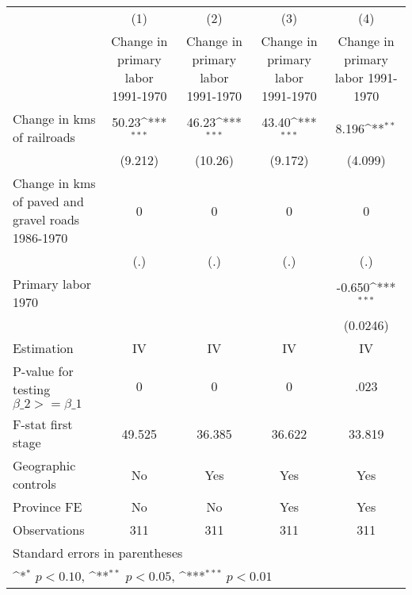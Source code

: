 {
\def\sym#1{\ifmmode^{#1}\else\(^{#1}\)\fi}
\begin{tabular}{l*{4}{c}}
\hline\hline
                &\multicolumn{1}{c}{(1)}&\multicolumn{1}{c}{(2)}&\multicolumn{1}{c}{(3)}&\multicolumn{1}{c}{(4)}\\
                &\multicolumn{1}{c}{Change in primary labor 1991-1970}&\multicolumn{1}{c}{Change in primary labor 1991-1970}&\multicolumn{1}{c}{Change in primary labor 1991-1970}&\multicolumn{1}{c}{Change in primary labor 1991-1970}\\
\hline
Change in kms of railroads&    50.23\sym{***}&    46.23\sym{***}&    43.40\sym{***}&    8.196\sym{**} \\
                &  (9.212)         &  (10.26)         &  (9.172)         &  (4.099)         \\
[1em]
Change in kms of paved and gravel roads 1986-1970&        0         &        0         &        0         &        0         \\
                &      (.)         &      (.)         &      (.)         &      (.)         \\
[1em]
Primary labor 1970&                  &                  &                  &   -0.650\sym{***}\\
                &                  &                  &                  & (0.0246)         \\
\hline
Estimation      &       IV         &       IV         &       IV         &       IV         \\
P-value for testing $\beta\_2 >= \beta\_1$&        0         &        0         &        0         &     .023         \\
F-stat first stage&   49.525         &   36.385         &   36.622         &   33.819         \\
Geographic controls&       No         &      Yes         &      Yes         &      Yes         \\
Province FE     &       No         &       No         &      Yes         &      Yes         \\
Observations    &      311         &      311         &      311         &      311         \\
\hline\hline
\multicolumn{5}{l}{\footnotesize Standard errors in parentheses}\\
\multicolumn{5}{l}{\footnotesize \sym{*} \(p<0.10\), \sym{**} \(p<0.05\), \sym{***} \(p<0.01\)}\\
\end{tabular}
}
